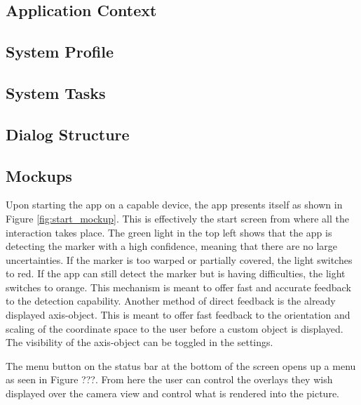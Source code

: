 \subsection{Application Context}

\subsection{System Profile}

\subsection{System Tasks}

\subsection{Dialog Structure}

\subsection{Mockups}

Upon starting the app on a capable device, the app presents itself as shown in Figure \ref{fig:start_mockup}.
This is effectively the start screen from where all the interaction takes place.
The green light in the top left shows that the app is detecting the marker with a high confidence, meaning that there are no large uncertainties.
If the marker is too warped or partially covered, the light switches to red.
If the app can still detect the marker but is having difficulties, the light switches to orange.
This mechanism is meant to offer fast and accurate feedback to the detection capability.
Another method of direct feedback is the already displayed axis-object.
This is meant to offer fast feedback to the orientation and scaling of the coordinate space to the user before a custom object is displayed.
The visibility of the axis-object can be toggled in the settings.

The menu button on the status bar at the bottom of the screen opens up a menu as seen in Figure ???.
From here the user can control the overlays they wish displayed over the camera view and control what is rendered into the picture.

